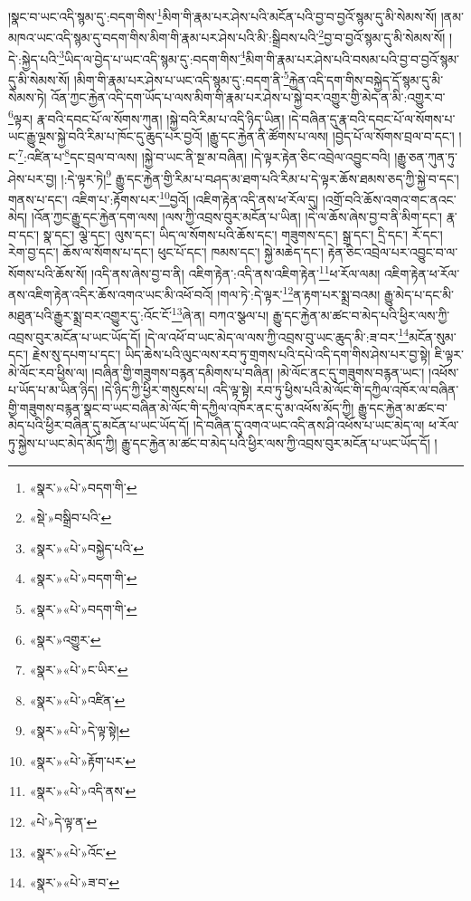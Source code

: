 །སྣང་བ་ཡང་འདི་སྙམ་དུ་:བདག་གིས་\footnote{«སྣར་»«པེ་»བདག་གི་}མིག་གི་རྣམ་པར་ཤེས་པའི་མངོན་པའི་བྱ་བ་བྱའོ་སྙམ་དུ་མི་སེམས་སོ། །ནམ་མཁའ་ཡང་འདི་སྙམ་དུ་བདག་གིས་མིག་གི་རྣམ་པར་ཤེས་པའི་མི་:སྒྲིབས་པའི་\footnote{«སྡེ་»བསྒྲིབ་པའི་}བྱ་བ་བྱའོ་སྙམ་དུ་མི་སེམས་སོ། །དེ་:སྐྱེད་པའི་\footnote{«སྣར་»«པེ་»བསྐྱེད་པའི་}ཡིད་ལ་བྱེད་པ་ཡང་འདི་སྙམ་དུ་:བདག་གིས་\footnote{«སྣར་»«པེ་»བདག་གི་}མིག་གི་རྣམ་པར་ཤེས་པའི་བསམ་པའི་བྱ་བ་བྱའོ་སྙམ་དུ་མི་སེམས་སོ། །མིག་གི་རྣམ་པར་ཤེས་པ་ཡང་འདི་སྙམ་དུ་:བདག་ནི་\footnote{«སྣར་»«པེ་»བདག་གི་}རྐྱེན་འདི་དག་གིས་བསྐྱེད་དོ་སྙམ་དུ་མི་སེམས་ཏེ། འོན་ཀྱང་རྐྱེན་འདི་དག་ཡོད་པ་ལས་མིག་གི་རྣམ་པར་ཤེས་པ་སྐྱེ་བར་འགྱུར་གྱི་མེད་ན་མི་:འགྱུར་བ་\footnote{«སྣར་»འགྱུར་}ལྟར། རྣ་བའི་དབང་པོ་ལ་སོགས་ཀུན། །སྐྱེ་བའི་རིམ་པ་འདི་ཉིད་ཡིན། །དེ་བཞིན་དུ་རྣ་བའི་དབང་པོ་ལ་སོགས་པ་ཡང་རྒྱུ་ལྔས་སྐྱེ་བའི་རིམ་པ་ཁོང་དུ་ཆུད་པར་བྱའོ། །རྒྱུ་དང་རྐྱེན་ནི་ཚོགས་པ་ལས། །བྱེད་པོ་ལ་སོགས་བྲལ་བ་དང་། །ང་\footnote{«སྣར་»«པེ་»ང་ཡིར་}:འཛིན་པ་\footnote{«སྣར་»«པེ་»འཛིན་}དང་བྲལ་བ་ལས། །སྐྱེ་བ་ཡང་ནི་སྔ་མ་བཞིན། །དེ་ལྟར་རྟེན་ཅིང་འབྲེལ་འབྱུང་བའི། །རྒྱུ་ཅན་ཀུན་ཏུ་ཤེས་པར་བྱ། །:དེ་ལྟར་ཏེ།\footnote{«སྣར་»«པེ་»དེ་ལྟ་སྟེ།} རྒྱུ་དང་རྐྱེན་གྱི་རིམ་པ་བཤད་མ་ཐག་པའི་རིམ་པ་དེ་ལྟར་ཆོས་ཐམས་ཅད་ཀྱི་སྐྱེ་བ་དང་། གནས་པ་དང་། འཇིག་པ་:རྟོགས་པར་\footnote{«སྣར་»«པེ་»རྟོག་པར་}བྱའོ། །འཇིག་རྟེན་འདི་ནས་ཕ་རོལ་དུ། །འགྲོ་བའི་ཆོས་འགའ་གང་ནའང་མེད། །འོན་ཀྱང་རྒྱུ་དང་རྐྱེན་དག་ལས། །ལས་ཀྱི་འབྲས་བུར་མངོན་པ་ཡིན། །དེ་ལ་ཆོས་ཞེས་བྱ་བ་ནི་མིག་དང་། རྣ་བ་དང་། སྣ་དང་། ལྕེ་དང་། ལུས་དང་། ཡིད་ལ་སོགས་པའི་ཆོས་དང་། གཟུགས་དང་། སྒྲ་དང་། དྲི་དང་། རོ་དང་། རེག་བྱ་དང་། ཆོས་ལ་སོགས་པ་དང་། ཕུང་པོ་དང་། ཁམས་དང་། སྐྱེ་མཆེད་དང་། རྟེན་ཅིང་འབྲེལ་པར་འབྱུང་བ་ལ་སོགས་པའི་ཆོས་སོ། །འདི་ནས་ཞེས་བྱ་བ་ནི། འཇིག་རྟེན་:འདི་ནས་འཇིག་རྟེན་\footnote{«སྣར་»«པེ་»འདི་ནས་}ཕ་རོལ་ལམ། འཇིག་རྟེན་ཕ་རོལ་ནས་འཇིག་རྟེན་འདིར་ཆོས་འགའ་ཡང་མི་འཕོ་བའོ། །གལ་ཏེ་:དེ་ལྟར་\footnote{«པེ་»དེ་ལྟ་ན་}ན་རྟག་པར་སྨྲ་བའམ། རྒྱུ་མེད་པ་དང་མི་མཐུན་པའི་རྒྱུར་སྨྲ་བར་འགྱུར་དུ་:འོང་ངོ་\footnote{«སྣར་»«པེ་»འོང་}ཞེ་ན། བཀའ་སྩལ་པ། རྒྱུ་དང་རྐྱེན་མ་ཚང་བ་མེད་པའི་ཕྱིར་ལས་ཀྱི་འབྲས་བུར་མངོན་པ་ཡང་ཡོད་དོ། །དེ་ལ་འཕོ་བ་ཡང་མེད་ལ་ལས་ཀྱི་འབྲས་བུ་ཡང་ཆུད་མི་:ཟ་བར་\footnote{«སྣར་»«པེ་»ཟ་བ་}མངོན་སུམ་དང་། རྗེས་སུ་དཔག་པ་དང་། ཡིད་ཆེས་པའི་ལུང་ལས་རབ་ཏུ་གྲགས་པའི་དཔེ་འདི་དག་གིས་ཤེས་པར་བྱ་སྟེ། ཇི་ལྟར་མེ་ལོང་རབ་ཕྱིས་ལ། །བཞིན་གྱི་གཟུགས་བརྙན་དམིགས་པ་བཞིན། །མེ་ལོང་ནང་དུ་གཟུགས་བརྙན་ཡང་། །འཕོས་པ་ཡོད་པ་མ་ཡིན་ཉིད། །དེ་ཉིད་ཀྱི་ཕྱིར་གསུངས་པ། འདི་ལྟ་སྟེ། རབ་ཏུ་ཕྱིས་པའི་མེ་ལོང་གི་དཀྱིལ་འཁོར་ལ་བཞིན་གྱི་གཟུགས་བརྙན་སྣང་བ་ཡང་བཞིན་མེ་ལོང་གི་དཀྱིལ་འཁོར་ནང་དུ་མ་འཕོས་མོད་ཀྱི། རྒྱུ་དང་རྐྱེན་མ་ཚང་བ་མེད་པའི་ཕྱིར་བཞིན་དུ་མངོན་པ་ཡང་ཡོད་དོ། །དེ་བཞིན་དུ་འགའ་ཡང་འདི་ནས་ཤི་འཕོས་པ་ཡང་མེད་ལ། ཕ་རོལ་ཏུ་སྐྱེས་པ་ཡང་མེད་མོད་ཀྱི། རྒྱུ་དང་རྐྱེན་མ་ཚང་བ་མེད་པའི་ཕྱིར་ལས་ཀྱི་འབྲས་བུར་མངོན་པ་ཡང་ཡོད་དོ། །
